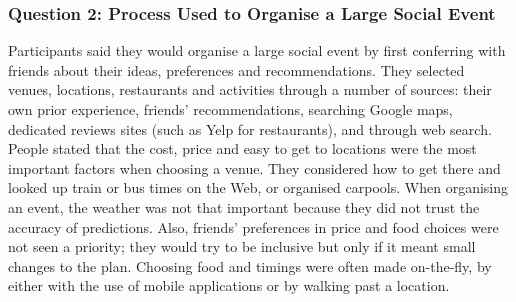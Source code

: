 \documentclass{sigchi}
\begin{document}
\subsubsection{Question 2: Process Used to Organise a Large Social Event}
Participants said they would organise a large social event by first conferring with friends about their ideas, preferences and recommendations.  They selected venues, locations, restaurants and activities through a number of sources: their own prior experience, friends' recommendations, searching Google maps, dedicated reviews sites (such as Yelp for restaurants), and through web search.  People stated that the cost, price and easy to get to locations were the most important factors when choosing a venue.  They considered how to get there and looked up train or bus times on the Web, or organised carpools.  When organising an event, the weather was not that important because they did not trust the accuracy of predictions.  Also, friends' preferences in price and food choices were not seen a priority; they would try to be inclusive but only if it meant small changes to the plan.  Choosing food and timings were often made on-the-fly, by either with the use of mobile applications or by walking past a location.

\end{document}
